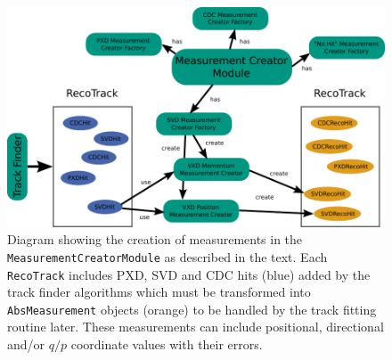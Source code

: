 \begin{figure}
  \centering
  \includegraphics[width=\linewidth]{figures/vxd/measurementCreator.pdf}
  \caption[Diagram showing the creation of measurements.]{Diagram showing the creation of measurements in the \texttt{MeasurementCreatorModule} as described in the text. Each \texttt{RecoTrack} includes PXD, SVD and CDC hits (blue) added by the track finder algorithms which must be transformed into \texttt{AbsMeasurement} objects (orange) to be handled by the track fitting routine later. These measurements can include positional, directional and/or $q/p$ coordinate values with their errors.}
  \label{fig-measurement-creator}
\end{figure}


